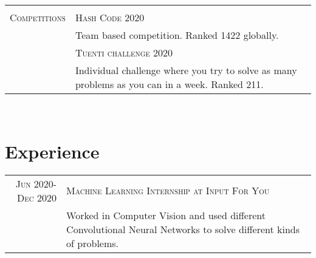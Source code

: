 \documentclass[a4paper,11pt]{article} %
\begin{document}
\begin{tabular}{p{3cm}|p{11cm}}
  \multicolumn{2}{c}{}                                                                                                                                                                                                                                                                \\
  \textsc{Competitions}                  & \textsc{Hash Code 2020}                                                                                                                                                                                                                    \\
                                         & \footnotesize Team based competition. Ranked 1422 globally.                                                                                                                                                                             \\
                                         & \textsc{Tuenti challenge 2020}                                                                                                                                                                                                             \\
                                         & \footnotesize Individual challenge where you try to solve as many problems as you can in a week. Ranked 211.
\end{tabular}\\


\section{Experience}

\begin{tabular}{r|p{11cm}}	
  \textsc{Jun 2020-Dec 2020}  & \textsc{Machine Learning Internship at Input For You} \\
  & \footnotesize Worked in Computer Vision  and used different Convolutional Neural Networks to solve different kinds of problems.
\end{tabular}\\



\end{document}
